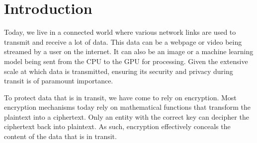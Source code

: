 
\chapter{Introduction}
\label{ch:Introduction}

Today, we live in a connected world where various network links are used to transmit and receive a lot of data. 
This data can be a webpage or video being streamed by a user on the internet. 
It can also be an image or a machine learning model being sent from the CPU to the GPU for processing. 
Given the extensive scale at which data is transmitted, ensuring its security and privacy during transit is of paramount importance.

To protect data that is in transit, we have come to rely on encryption. 
Most encryption mechanisms today rely on mathematical functions that transform the plaintext into a ciphertext. 
Only an entity with the correct key can decipher the ciphertext back into plaintext. 
As such, encryption effectively conceals the content of the data that is in transit.

